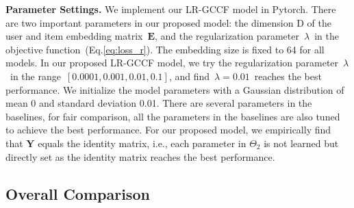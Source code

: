 \documentclass[letterpaper]{article} %
\newcommand{\Mat}[1]{\mathbf{#1}}
\begin{document}
\textbf{Parameter Settings.} We implement our LR-GCCF model in Pytorch. There are two important parameters in our proposed model: the dimension D of the user and item embedding matrix~$\Mat{E}$, and the regularization parameter~$\lambda$~in the objective function~(Eq.\ref{eq:loss_r}). The embedding size is fixed to 64 for all models. In our proposed LR-GCCF model, we try the regularization parameter~$\lambda$~in the range~$[0.0001, 0.001, 0.01, 0.1]$,
and find~$\lambda=0.01$~reaches the best performance. We initialize the model parameters with a Gaussian distribution of mean 0 and standard deviation 0.01. There are several parameters in the baselines, for fair comparison, all the parameters in the baselines are also tuned to achieve the best performance.  For our proposed model, we empirically find that $\Mat{Y}$ equals the identity matrix, i.e., each parameter in $\Theta_2$ is not learned but directly set as the identity matrix reaches the best performance.

\subsection{Overall Comparison}
\end{document}
